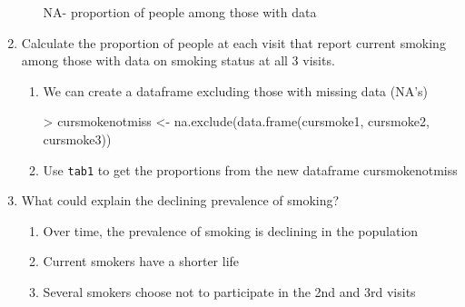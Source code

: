 \documentclass{article}
\begin{document}
\begin{enumerate}
\begin{enumerate}
NA- proportion of people among those with data
\end{enumerate}
\pagebreak
\item Calculate the proportion of people at each visit that report current smoking among those with data on smoking status at all 3 visits.
\begin{enumerate}
  \item We can create a dataframe excluding those with missing data (NA's)
\begin{Schunk}
\begin{Sinput}
> cursmokenotmiss <- na.exclude(data.frame(cursmoke1, cursmoke2, cursmoke3))
\end{Sinput}
\end{Schunk}
  \item Use \texttt{tab1} to get the proportions from the new dataframe cursmokenotmiss
\begin{Schunk}
\end{Schunk}

\end{enumerate}

\item What could explain the declining prevalence of smoking? 
\begin{enumerate}
  \item Over time, the prevalence of smoking is declining in the population
  \item Current smokers have a shorter life
  \item Several smokers choose not to participate in the 2nd and 3rd visits
\end{enumerate}


\end{enumerate}
\end{document}
